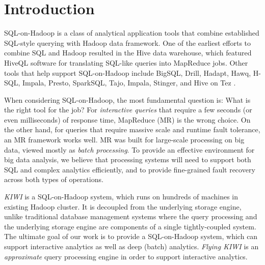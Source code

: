 \documentclass{sig-alternate-05-2015}
\begin{document}


%
%

%
%
\printccsdesc



\section{Introduction}
SQL-on-Hadoop is a class of analytical application tools that combine established SQL-style querying with Hadoop data framework.
One of the earliest efforts to combine SQL and Hadoop resulted in the Hive data warehouse, which featured HiveQL software for translating SQL-like queries into MapReduce jobs. Other tools that help support SQL-on-Hadoop include BigSQL, Drill, Hadapt, Hawq, H-SQL, Impala, Presto, SparkSQL, Tajo, Impala, Stinger, and Hive on Tez \cite{Babcock:2003, Chaudhuri:2007, Zeng:2015, Floratou:2014, Agarwal:2014, Agarwal:2013}.

When considering SQL-on-Hadoop, the most fundamental question is: What is the right tool for the job? For \textit{interactive queries} that require a few seconds (or even milliseconds) of response time, MapReduce (MR) is the wrong choice. On the other hand, for queries that require massive scale and runtime fault tolerance, an MR framework works well. MR was built for large-scale processing on big data, viewed mostly as \textit{batch processing}.
To provide an effective environment for big data analysis, we believe that processing systems will need to support both SQL and complex analytics efficiently, and to provide fine-grained fault recovery across both types of operations.

\textit{KIWI} is a  SQL-on-Hadoop system, which runs on hundreds of machines in existing Hadoop cluster.
It is decoupled from the underlying storage engine, unlike traditional database management systems where the query processing and the underlying storage engine are components of a single tightly-coupled system.
The ultimate goal of our work is to provide a SQL-on-Hadoop system, which can support interactive analytics as well as deep (batch) analytics. \textit{Flying KIWI} is an \textit{approximate} query processing engine in order to support interactive analytics.
\end{document}
